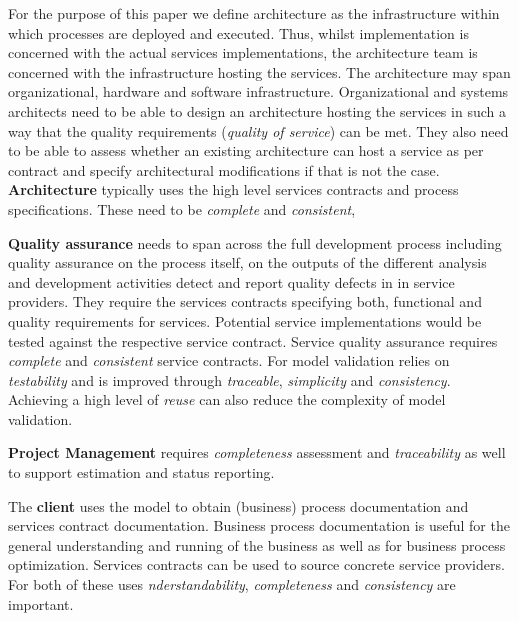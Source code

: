 For the purpose of this paper we define architecture as the infrastructure within which processes are deployed and executed. Thus, whilst implementation is concerned with the actual services implementations, the architecture team is concerned with the infrastructure hosting the services. The architecture may span organizational, hardware and software infrastructure. Organizational and systems architects need to be able to design an architecture hosting the services in such a way that the quality requirements (\emph{quality of service}) can be met. They also need to be able to assess whether an existing architecture can host a service as per contract and specify architectural modifications if that is not the case. {\bf Architecture} typically uses the high level services contracts and process specifications. These need to be \emph{complete} and \emph{consistent}, 

{\bf Quality assurance} needs to span across the full development process including quality assurance on the process itself, on the outputs of the different analysis and development activities detect and report quality defects in in service providers. They require the services contracts specifying both, functional and quality requirements for services. Potential service implementations would be tested against the respective service contract. Service quality assurance requires \emph{complete} and \emph{consistent} service contracts. For model validation relies on \emph{testability} and is improved through \emph{traceable}, \emph{simplicity} and \emph{consistency}. Achieving a high level of \emph{reuse} can also reduce the complexity of model validation.

{\bf Project Management} requires \emph{completeness} assessment and \emph{traceability} as well to support estimation and status reporting.

The {\bf client} uses the model to obtain (business) process documentation and services contract documentation. Business process documentation is useful for the general understanding and running of the business as well as for business process optimization. Services contracts can be used to source concrete service providers. For both of these uses \emph{nderstandability}, \emph{completeness} and \emph{consistency} are important.

